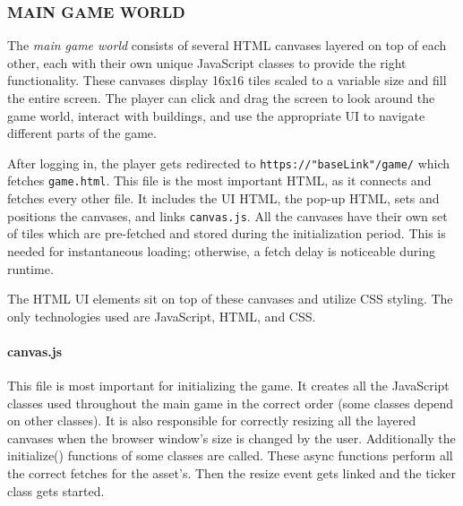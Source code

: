 \documentclass[12pt]{article}
\begin{document}
\subsubsection{MAIN GAME WORLD}
The \textit{main game world} consists of several HTML canvases layered on top of each other, each with their own unique
JavaScript classes to provide the right functionality. These canvases display 16x16 tiles scaled to a variable size and
fill the entire screen. The player can click and drag the screen to look around the game world, interact with buildings,
and use the appropriate UI to navigate different parts of the game.

After logging in, the player gets redirected to \texttt{https://"baseLink"/game/} which fetches \texttt{game.html}. This
file is the most important HTML, as it connects and fetches every other file. It includes the UI HTML, the pop-up HTML,
sets and positions the canvases, and links \texttt{canvas.js}. All the canvases have their own set of tiles which are
pre-fetched and stored during the initialization period. This is needed for instantaneous loading; otherwise, a fetch
delay is noticeable during runtime.

The HTML UI elements sit on top of these canvases and utilize CSS styling. The only technologies used are JavaScript,
HTML, and CSS.


\paragraph{canvas.js} This file is most important for initializing the game. It creates all the JavaScript classes used
throughout the main game in the correct order (some classes depend on other classes). It is also responsible for
correctly resizing all the layered canvases when the browser window's size is changed by the user. Additionally the
initialize() functions of some classes are called. These async functions perform all the correct fetches for the
asset's. Then the resize event gets linked and the ticker class gets started.
\end{document}
